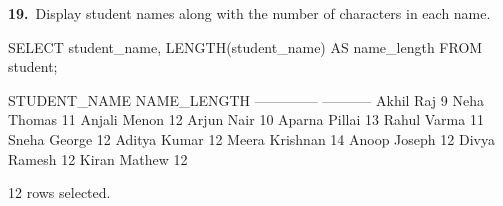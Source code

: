\noindent\begin{minipage}{\linewidth}
\begingroup{}
{\fontsize{14}{17}\selectfont\textbf{19.}}\ Display student names along with the number of characters in each name.\par
\endgroup\vspace{12pt}


\begin{sqlcode}
SELECT student_name, LENGTH(student_name) AS name_length
FROM student;
\end{sqlcode}

\vspace{18pt}


\begin{sqlout}[fontsize=\small]
STUDENT_NAME    NAME_LENGTH
--------------  -----------
Akhil Raj                 9
Neha Thomas              11
Anjali Menon             12
Arjun Nair               10
Aparna Pillai            13
Rahul Varma              11
Sneha George             12
Aditya Kumar             12
Meera Krishnan           14
Anoop Joseph             12
Divya Ramesh             12
Kiran Mathew             12

12 rows selected.
\end{sqlout}
\end{minipage}\par\vspace{24pt}

